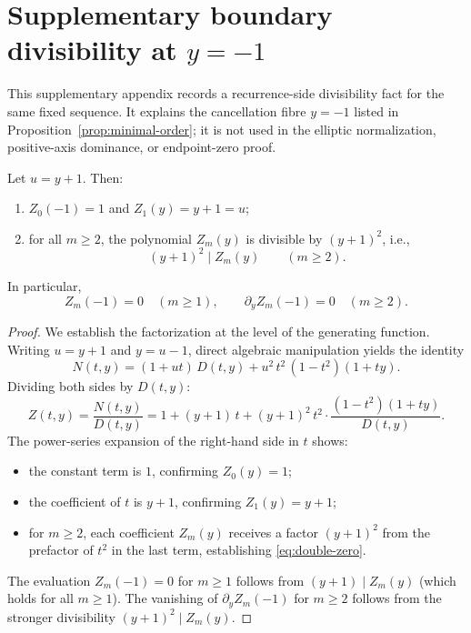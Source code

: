 \section{Supplementary boundary divisibility at \texorpdfstring{\(y=-1\)}{y=-1}}\label{sec:boundary-zeros}

This supplementary appendix records a recurrence-side divisibility fact for the same fixed sequence.  It explains the cancellation fibre $y=-1$ listed in Proposition~\ref{prop:minimal-order}; it is not used in the elliptic normalization, positive-axis dominance, or endpoint-zero proof.

\begin{proposition}[Uniform boundary zero of order at least two at $y = -1$]\label{prop:double-zero}
Let $u = y + 1$.
Then:
\begin{enumerate}
\item $Z_0(-1) = 1$ and $Z_1(y) = y + 1 = u$;
\item for all $m \ge 2$, the polynomial $Z_m(y)$ is divisible by $(y+1)^2$, i.e.,
\begin{equation}\label{eq:double-zero}
(y+1)^2 \mid Z_m(y) \qquad (m \ge 2).
\end{equation}
\end{enumerate}
In particular,
\[
Z_m(-1) = 0 \quad (m \ge 1), \qquad
\partial_y Z_m(-1) = 0 \quad (m \ge 2).
\]
\end{proposition}

\begin{proof}
We establish the factorization at the level of the generating function.
Writing $u = y + 1$ and $y = u - 1$, direct algebraic manipulation yields the identity
\begin{equation}\label{eq:N-D-identity}
N(t,y) = (1 + ut)\,D(t,y) + u^2\,t^2\,(1 - t^2)(1 + ty).
\end{equation}
Dividing both sides by $D(t,y)$:
\begin{equation}\label{eq:Z-factored}
Z(t,y) = \frac{N(t,y)}{D(t,y)}
= 1 + (y+1)\,t + (y+1)^2\,t^2 \cdot \frac{(1 - t^2)(1 + ty)}{D(t,y)}.
\end{equation}
The power-series expansion of the right-hand side in $t$ shows:
\begin{itemize}
\item the constant term is $1$, confirming $Z_0(y) = 1$;
\item the coefficient of $t$ is $y + 1$, confirming $Z_1(y) = y + 1$;
\item for $m \ge 2$, each coefficient $Z_m(y)$ receives a factor $(y+1)^2$ from the prefactor of $t^2$ in the last term, establishing \eqref{eq:double-zero}.
\end{itemize}
The evaluation $Z_m(-1) = 0$ for $m \ge 1$ follows from $(y+1) \mid Z_m(y)$ (which holds for all $m \ge 1$).
The vanishing of $\partial_y Z_m(-1)$ for $m \ge 2$ follows from the stronger divisibility $(y+1)^2 \mid Z_m(y)$.
\end{proof}

